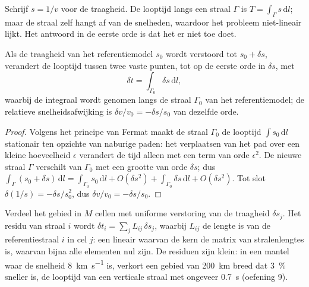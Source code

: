 Schrijf $s = 1/v$ voor de traagheid. De looptijd langs een straal $\Gamma$ is
$T = \int_\Gamma s\,\mathrm dl$; maar de straal zelf hangt af van de snelheden,
waardoor het probleem niet-lineair lijkt. Het antwoord in de eerste orde is dat het
er niet toe doet.

\begin{proposition}\label{prop:b3:seismology-imaging:linear}
Als de traagheid van het referentiemodel $s_0$ wordt verstoord tot $s_0 + \delta s$,
verandert de looptijd tussen twee vaste punten, tot op de eerste orde in
$\delta s$, met
\[
  \delta t = \int_{\Gamma_0}\delta s\,\mathrm dl ,
\]
waarbij de integraal wordt genomen langs de straal $\Gamma_0$ van het referentiemodel; de
relatieve snelheidsafwijking is $\delta v/v_0 = -\delta s/s_0$ van dezelfde orde.
\end{proposition}

\begin{proof}
Volgens het principe van Fermat maakt de straal $\Gamma_0$ de looptijd
$\int s_0\,\mathrm dl$ stationair ten opzichte van naburige paden: het verplaatsen van het pad over een
kleine hoeveelheid $\epsilon$ verandert de tijd alleen met een term van orde $\epsilon^2$.
De nieuwe straal $\Gamma$ verschilt van $\Gamma_0$ met een grootte van orde $\delta s$;
dus $\int_\Gamma(s_0 + \delta s)\,\mathrm dl = \int_{\Gamma_0}s_0\,\mathrm dl +
O(\delta s^2) + \int_{\Gamma_0}\delta s\,\mathrm dl + O(\delta s^2)$. Tot slot
$\delta(1/s) = -\delta s/s_0^2$, dus $\delta v/v_0 = -\delta s/s_0$.
\end{proof}

Verdeel het gebied in $M$ cellen met uniforme verstoring van de traagheid $\delta s_j$.
Het residu van straal $i$ wordt $\delta t_i = \sum_j L_{ij}\,\delta s_j$, waarbij
$L_{ij}$ de lengte is van de referentiestraal $i$ in cel $j$: een lineair  waarvan de kern de matrix van stralenlengtes is, waarvan bijna alle elementen
nul zijn. De residuen zijn klein: in een mantel waar de snelheid \qty{8}{km.s^{-1}} is,
verkort een gebied van \qty{200}{km} breed dat \qty{3}{\percent}
sneller is, de looptijd van een verticale straal met ongeveer \qty{0.7}{s} (oefening 9).

